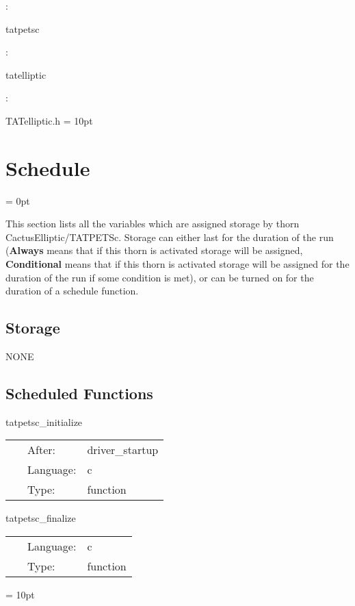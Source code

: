 \documentclass[12pt]{article}
\begin{document}
: 

tatpetsc
\vspace{2mm}

: 

tatelliptic
\vspace{2mm}

\vspace{5mm}

: 

TATelliptic.h
\vspace{2mm}\parskip = 10pt 

\section{Schedule} 


\parskip = 0pt


\noindent This section lists all the variables which are assigned storage by thorn CactusElliptic/TATPETSc.  Storage can either last for the duration of the run ({\bf Always} means that if this thorn is activated storage will be assigned, {\bf Conditional} means that if this thorn is activated storage will be assigned for the duration of the run if some condition is met), or can be turned on for the duration of a schedule function.


\subsection*{Storage}NONE
\subsection*{Scheduled Functions}
\vspace{5mm}


\hspace{5mm} tatpetsc\_initialize 

\hspace{5mm}{\it initialise petsc } 


\hspace{5mm}

 \begin{tabular*}{160mm}{cll} 
~ & After:  & driver\_startup \\ 
~ & Language:  & c \\ 
~ & Type:  & function \\ 
\end{tabular*} 


\vspace{5mm}


\hspace{5mm} tatpetsc\_finalize 

\hspace{5mm}{\it finalise petsc } 


\hspace{5mm}

 \begin{tabular*}{160mm}{cll} 
~ & Language:  & c \\ 
~ & Type:  & function \\ 
\end{tabular*} 



\vspace{5mm}\parskip = 10pt 
\end{document}
